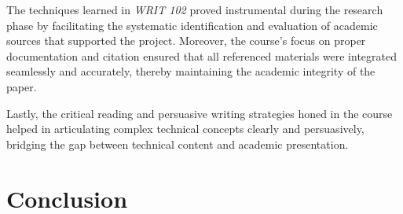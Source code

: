 \documentclass[a4paper, 12pt, one column, aas_macros]{article}
\begin{document}
The techniques learned in \textit{WRIT 102} proved instrumental during the research phase by facilitating the systematic identification and evaluation of academic sources that supported the project. Moreover, the course’s focus on proper documentation and citation ensured that all referenced materials were integrated seamlessly and accurately, thereby maintaining the academic integrity of the paper.

Lastly, the critical reading and persuasive writing strategies honed in the course helped in articulating complex technical concepts clearly and persuasively, bridging the gap between technical content and academic presentation.

\section{Conclusion}


\end{document}
